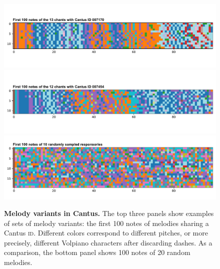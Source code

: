 \documentclass{article}
\begin{document}
\begin{figure}
    \centering
    \includegraphics[width=\textwidth]{figs/figS11-melody-variants-0.pdf}
    \includegraphics[width=\textwidth]{figs/figS11-melody-variants-1.pdf}
    \includegraphics[width=\textwidth]{figs/figS11-melody-variants-random.pdf}
    \caption{
        \textbf{Melody variants in Cantus.}
        The top three panels show examples of sets of melody variants:
        the first 100 notes of melodies sharing a Cantus \textsc{id}. 
        Different colors correspond to different pitches, or more precisely, different Volpiano characters after discarding dashes.
        As a comparison, the bottom panel shows 100 notes of 20 random melodies.
        \label{suppl:melody-variants}
    }
\end{figure}
\end{document}
